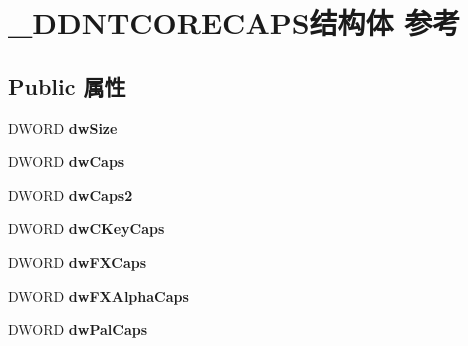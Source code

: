 \hypertarget{struct___d_d_n_t_c_o_r_e_c_a_p_s}{}\section{\+\_\+\+D\+D\+N\+T\+C\+O\+R\+E\+C\+A\+P\+S结构体 参考}
\label{struct___d_d_n_t_c_o_r_e_c_a_p_s}
\subsection*{Public 属性}
\begin{DoxyCompactItemize}
\item 
\mbox{\label{struct___d_d_n_t_c_o_r_e_c_a_p_s_aea0ac14f9cf61b6890778f4d8f3eae3c}} 
D\+W\+O\+RD {\bfseries dw\+Size}
\item 
\mbox{\label{struct___d_d_n_t_c_o_r_e_c_a_p_s_a20e17ac0c186922a160575ee677d15ff}} 
D\+W\+O\+RD {\bfseries dw\+Caps}
\item 
\mbox{\label{struct___d_d_n_t_c_o_r_e_c_a_p_s_aeffbc67e38afd6da320d49ff85ef8553}} 
D\+W\+O\+RD {\bfseries dw\+Caps2}
\item 
\mbox{\label{struct___d_d_n_t_c_o_r_e_c_a_p_s_a630aa613fb5534e278b1100a8550a4db}} 
D\+W\+O\+RD {\bfseries dw\+C\+Key\+Caps}
\item 
\mbox{\label{struct___d_d_n_t_c_o_r_e_c_a_p_s_a017581386897301c9dbe117b5d2729e1}} 
D\+W\+O\+RD {\bfseries dw\+F\+X\+Caps}
\item 
\mbox{\label{struct___d_d_n_t_c_o_r_e_c_a_p_s_afef3b6dd4bc9c3a20e08f214422fe38a}} 
D\+W\+O\+RD {\bfseries dw\+F\+X\+Alpha\+Caps}
\item 
\mbox{\label{struct___d_d_n_t_c_o_r_e_c_a_p_s_aa36dc974f87d218c3749e74e090fc38e}} 
D\+W\+O\+RD {\bfseries dw\+Pal\+Caps}
\item 
\mbox{\label{struct___d_d_n_t_c_o_r_e_c_a_p_s_afa43a5340b7683a3f7ac99d717062fea}} 

\end{DoxyCompactItemize}
